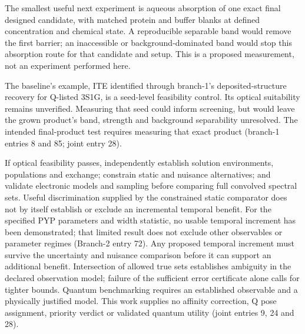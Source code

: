 \documentclass{article}
\begin{document}
The smallest useful next experiment is aqueous absorption of one exact final designed candidate, with matched protein and buffer blanks at defined concentration and chemical state. A reproducible separable band would remove the first barrier; an inaccessible or background-dominated band would stop this absorption route for that candidate and setup. This is a proposed measurement, not an experiment performed here.

The baseline's example, ITE identified through branch-1's deposited-structure recovery for Q-listed 3S1G, is a seed-level feasibility control. Its optical suitability remains unverified. Measuring that seed could inform screening, but would leave the grown product's band, strength and background separability unresolved. The intended final-product test requires measuring that exact product (branch-1 entries 8 and 85; joint entry 28).

If optical feasibility passes, independently establish solution environments, populations and exchange; constrain static and nuisance alternatives; and validate electronic models and sampling before comparing full convolved spectral sets. Useful discrimination supplied by the constrained static comparator does not by itself establish or exclude an incremental temporal benefit. For the specified PYP parameters and width statistic, no usable temporal increment has been demonstrated; that limited result does not exclude other observables or parameter regimes (Branch-2 entry 72). Any proposed temporal increment must survive the uncertainty and nuisance comparison before it can support an additional benefit. Intersection of allowed true sets establishes ambiguity in the declared observation model; failure of the sufficient error certificate alone calls for tighter bounds. Quantum benchmarking requires an established observable and a physically justified model. This work supplies no affinity correction, Q pose assignment, priority verdict or validated quantum utility (joint entries 9, 24 and 28).

\clearpage


\end{document}
